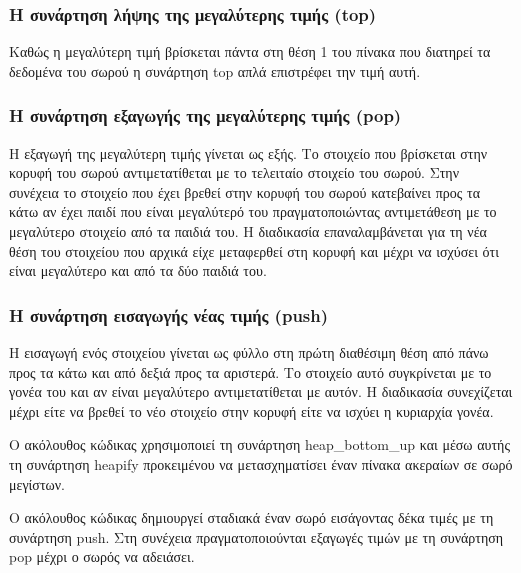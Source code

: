 

\subsubsection*{Η συνάρτηση λήψης της μεγαλύτερης τιμής (top)}
Καθώς η μεγαλύτερη τιμή βρίσκεται πάντα στη θέση 1 του πίνακα που διατηρεί τα δεδομένα του σωρού η συνάρτηση top απλά επιστρέφει την τιμή αυτή.
\subsubsection*{Η συνάρτηση εξαγωγής της μεγαλύτερης τιμής (pop)}
Η εξαγωγή της μεγαλύτερη τιμής γίνεται ως εξής. Το στοιχείο που βρίσκεται στην κορυφή του σωρού αντιμετατίθεται με το τελειταίο στοιχείο του σωρού. Στην συνέχεια το στοιχείο που έχει βρεθεί στην κορυφή του σωρού κατεβαίνει προς τα κάτω αν έχει παιδί που είναι μεγαλύτερό του πραγματοποιώντας αντιμετάθεση με το μεγαλύτερο στοιχείο από τα παιδιά του. Η διαδικασία επαναλαμβάνεται για τη νέα θέση του στοιχείου που αρχικά είχε μεταφερθεί στη κορυφή και μέχρι να ισχύσει ότι είναι μεγαλύτερο και από τα δύο παιδιά του.
\subsubsection*{Η συνάρτηση εισαγωγής νέας τιμής (push)}
Η εισαγωγή ενός στοιχείου γίνεται ως φύλλο στη πρώτη διαθέσιμη θέση από πάνω προς τα κάτω και από δεξιά προς τα αριστερά. Το στοιχείο αυτό συγκρίνεται με το γονέα του και αν είναι μεγαλύτερο αντιμετατίθεται με αυτόν. Η διαδικασία συνεχίζεται μέχρι είτε να βρεθεί το νέο στοιχείο στην κορυφή είτε να ισχύει η κυριαρχία γονέα.

Ο ακόλουθος κώδικας χρησιμοποιεί τη συνάρτηση heap\_bottom\_up και μέσω αυτής τη συνάρτηση heapify προκειμένου να μετασχηματίσει έναν πίνακα ακεραίων σε σωρό μεγίστων. 




Ο ακόλουθος κώδικας δημιουργεί σταδιακά έναν σωρό εισάγοντας δέκα τιμές με τη συνάρτηση push. Στη συνέχεια πραγματοποιούνται εξαγωγές τιμών με τη συνάρτηση pop μέχρι ο σωρός να αδειάσει.



